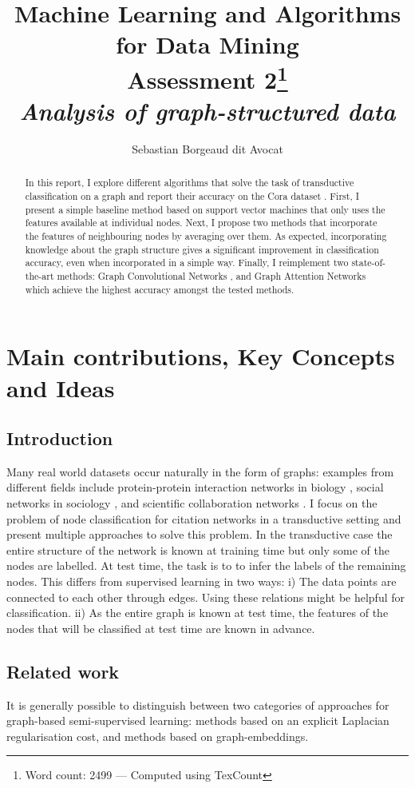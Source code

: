 \documentclass[12pt]{article}
\title{{\small{Machine Learning and Algorithms for Data Mining} \\
Assessment 2\footnote{Word count: 2499 --- Computed using TexCount}} \\
\textit{Analysis of graph-structured data}}
\author{Sebastian Borgeaud dit Avocat}
\theoremstyle{definition}
\begin{document}
\maketitle

\begin{abstract}
	In this report, I explore different algorithms that solve the task of transductive classification on a graph and report their accuracy on the Cora dataset \cite{cora}. First, I present a simple baseline method based on support vector machines that only uses the features available at individual nodes. Next, I propose two methods that incorporate the features of neighbouring nodes by averaging over them. As expected, incorporating knowledge about the graph structure gives a significant improvement in classification accuracy, even when incorporated in a simple way. Finally, I reimplement two state-of-the-art methods: Graph Convolutional Networks \cite{kipf2017semi}, and Graph Attention Networks \cite{velickovic2018graph} which achieve the highest accuracy amongst the tested methods.
\end{abstract}

\section{Main contributions, Key Concepts and Ideas}
\subsection{Introduction}
Many real world datasets occur naturally in the form of graphs: examples from different fields include protein-protein interaction networks in biology \cite{schwikowski2000network}, social networks in sociology \cite{otte2002social}, and scientific collaboration networks \cite{newman2001structure}. I focus on the problem of node classification for citation networks in a transductive setting and present multiple approaches to solve this problem. In the transductive case the entire structure of the network is known at training time but only some of the nodes are labelled. At test time, the task is to to infer the labels of the remaining nodes. This differs from supervised learning in two ways: i) The data points are connected to each other through edges. Using these relations might be helpful for classification. ii) As the entire graph is known at test time, the features of the nodes that will be classified at test time are known in advance. 

\subsection{Related work}
It is generally possible to distinguish between two categories of approaches for graph-based semi-supervised learning: methods based on an explicit Laplacian regularisation cost, and methods based on graph-embeddings.
\end{document}

